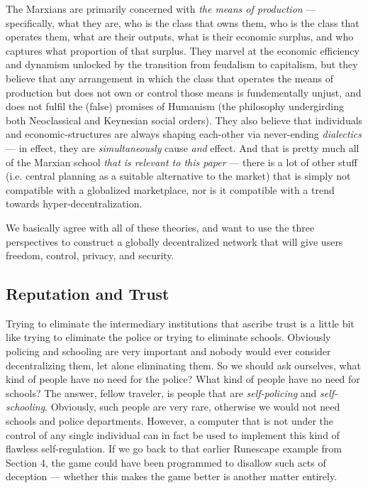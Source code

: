 \documentclass[a4paper]{article}
\begin{document}
The Marxians are primarily concerned with \emph{the means of production
} --- specifically, what they are, who is the class that owns them, who
is the class that operates them, what are their outputs, what is their
economic surplus, and who captures what proportion of that surplus. They
marvel at the economic efficiency and dynamism unlocked by the
transition from feudalism to capitalism, but they believe that any
arrangement in which the class that operates the means of production but
does not own or control those means is fundementally unjust, and does
not fulfil the (false) promises of Humanism (the philosophy undergirding
both Neoclassical and Keynesian social orders). They also believe that
individuals and economic-structures are always shaping each-other via
never-ending \emph{dialectics} --- in effect, they are \emph{
simultaneously} cause \emph{and} effect. And that is pretty much all
of the Marxian school \emph{that is relevant to this paper} --- there
is a lot of other stuff (i.e. central planning as a suitable alternative
to the market) that is simply not compatible with a globalized
marketplace, nor is it compatible with a trend towards
hyper-decentralization.

We basically agree with all of these theories, and want to use the three
perspectives to construct a globally decentralized network that will
give users freedom, control, privacy, and security.

\subsection{Reputation and Trust}
Trying to eliminate the intermediary institutions that ascribe trust is
a little bit like trying to eliminate the police or trying to eliminate
schools. Obviously policing and schooling are very important and nobody
would ever consider decentralizing them, let alone eliminating them. So
we should ask ourselves, what kind of people have no need for the
police? What kind of people have no need for schools? The answer, fellow
traveler, is people that are \emph{self-policing} and \emph{
self-schooling}. Obviously, such people are very rare, otherwise we
would not need schools and police departments. However, a computer that
is not under the control of any single individual can in fact be used to
implement this kind of flawless self-regulation. If we go back to that
earlier Runescape example from Section 4, the game could have been
programmed to disallow such acts of deception --- whether this makes the
game better is another matter entirely.
\end{document}
